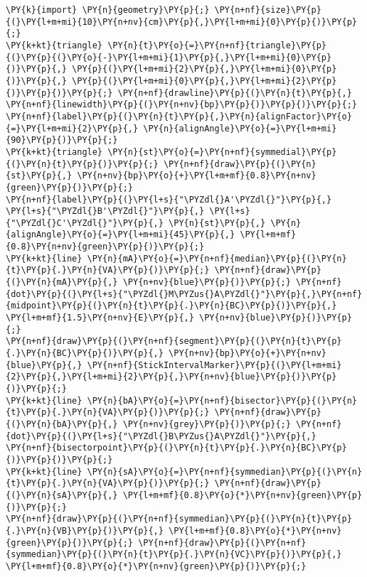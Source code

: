 \begin{Verbatim}[commandchars=\\\{\}]
\PY{k}{import} \PY{n}{geometry}\PY{p}{;} \PY{n+nf}{size}\PY{p}{(}\PY{l+m+mi}{10}\PY{n+nv}{cm}\PY{p}{,}\PY{l+m+mi}{0}\PY{p}{)}\PY{p}{;}
\PY{k+kt}{triangle} \PY{n}{t}\PY{o}{=}\PY{n+nf}{triangle}\PY{p}{(}\PY{p}{(}\PY{o}{-}\PY{l+m+mi}{1}\PY{p}{,}\PY{l+m+mi}{0}\PY{p}{)}\PY{p}{,} \PY{p}{(}\PY{l+m+mi}{2}\PY{p}{,}\PY{l+m+mi}{0}\PY{p}{)}\PY{p}{,} \PY{p}{(}\PY{l+m+mi}{0}\PY{p}{,}\PY{l+m+mi}{2}\PY{p}{)}\PY{p}{)}\PY{p}{;} \PY{n+nf}{drawline}\PY{p}{(}\PY{n}{t}\PY{p}{,} \PY{n+nf}{linewidth}\PY{p}{(}\PY{n+nv}{bp}\PY{p}{)}\PY{p}{)}\PY{p}{;}
\PY{n+nf}{label}\PY{p}{(}\PY{n}{t}\PY{p}{,}\PY{n}{alignFactor}\PY{o}{=}\PY{l+m+mi}{2}\PY{p}{,} \PY{n}{alignAngle}\PY{o}{=}\PY{l+m+mi}{90}\PY{p}{)}\PY{p}{;}
\PY{k+kt}{triangle} \PY{n}{st}\PY{o}{=}\PY{n+nf}{symmedial}\PY{p}{(}\PY{n}{t}\PY{p}{)}\PY{p}{;} \PY{n+nf}{draw}\PY{p}{(}\PY{n}{st}\PY{p}{,} \PY{n+nv}{bp}\PY{o}{+}\PY{l+m+mf}{0.8}\PY{n+nv}{green}\PY{p}{)}\PY{p}{;}
\PY{n+nf}{label}\PY{p}{(}\PY{l+s}{"\PYZdl{}A'\PYZdl{}"}\PY{p}{,} \PY{l+s}{"\PYZdl{}B'\PYZdl{}"}\PY{p}{,} \PY{l+s}{"\PYZdl{}C'\PYZdl{}"}\PY{p}{,} \PY{n}{st}\PY{p}{,} \PY{n}{alignAngle}\PY{o}{=}\PY{l+m+mi}{45}\PY{p}{,} \PY{l+m+mf}{0.8}\PY{n+nv}{green}\PY{p}{)}\PY{p}{;}
\PY{k+kt}{line} \PY{n}{mA}\PY{o}{=}\PY{n+nf}{median}\PY{p}{(}\PY{n}{t}\PY{p}{.}\PY{n}{VA}\PY{p}{)}\PY{p}{;} \PY{n+nf}{draw}\PY{p}{(}\PY{n}{mA}\PY{p}{,} \PY{n+nv}{blue}\PY{p}{)}\PY{p}{;} \PY{n+nf}{dot}\PY{p}{(}\PY{l+s}{"\PYZdl{}M\PYZus{}A\PYZdl{}"}\PY{p}{,}\PY{n+nf}{midpoint}\PY{p}{(}\PY{n}{t}\PY{p}{.}\PY{n}{BC}\PY{p}{)}\PY{p}{,} \PY{l+m+mf}{1.5}\PY{n+nv}{E}\PY{p}{,} \PY{n+nv}{blue}\PY{p}{)}\PY{p}{;}
\PY{n+nf}{draw}\PY{p}{(}\PY{n+nf}{segment}\PY{p}{(}\PY{n}{t}\PY{p}{.}\PY{n}{BC}\PY{p}{)}\PY{p}{,} \PY{n+nv}{bp}\PY{o}{+}\PY{n+nv}{blue}\PY{p}{,} \PY{n+nf}{StickIntervalMarker}\PY{p}{(}\PY{l+m+mi}{2}\PY{p}{,}\PY{l+m+mi}{2}\PY{p}{,}\PY{n+nv}{blue}\PY{p}{)}\PY{p}{)}\PY{p}{;}
\PY{k+kt}{line} \PY{n}{bA}\PY{o}{=}\PY{n+nf}{bisector}\PY{p}{(}\PY{n}{t}\PY{p}{.}\PY{n}{VA}\PY{p}{)}\PY{p}{;} \PY{n+nf}{draw}\PY{p}{(}\PY{n}{bA}\PY{p}{,} \PY{n+nv}{grey}\PY{p}{)}\PY{p}{;} \PY{n+nf}{dot}\PY{p}{(}\PY{l+s}{"\PYZdl{}B\PYZus{}A\PYZdl{}"}\PY{p}{,} \PY{n+nf}{bisectorpoint}\PY{p}{(}\PY{n}{t}\PY{p}{.}\PY{n}{BC}\PY{p}{)}\PY{p}{)}\PY{p}{;}
\PY{k+kt}{line} \PY{n}{sA}\PY{o}{=}\PY{n+nf}{symmedian}\PY{p}{(}\PY{n}{t}\PY{p}{.}\PY{n}{VA}\PY{p}{)}\PY{p}{;} \PY{n+nf}{draw}\PY{p}{(}\PY{n}{sA}\PY{p}{,} \PY{l+m+mf}{0.8}\PY{o}{*}\PY{n+nv}{green}\PY{p}{)}\PY{p}{;}
\PY{n+nf}{draw}\PY{p}{(}\PY{n+nf}{symmedian}\PY{p}{(}\PY{n}{t}\PY{p}{.}\PY{n}{VB}\PY{p}{)}\PY{p}{,} \PY{l+m+mf}{0.8}\PY{o}{*}\PY{n+nv}{green}\PY{p}{)}\PY{p}{;} \PY{n+nf}{draw}\PY{p}{(}\PY{n+nf}{symmedian}\PY{p}{(}\PY{n}{t}\PY{p}{.}\PY{n}{VC}\PY{p}{)}\PY{p}{,} \PY{l+m+mf}{0.8}\PY{o}{*}\PY{n+nv}{green}\PY{p}{)}\PY{p}{;}

\end{Verbatim}
